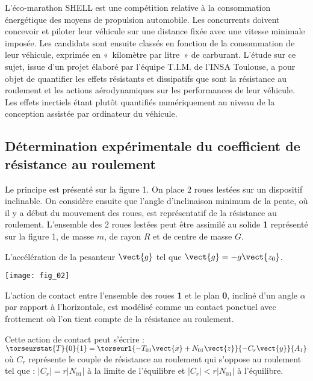 \ifprof
\else
\begin{multicols}{2}
\fi

\ifprof
\else
L’éco-marathon SHELL est une compétition relative à la consommation énergétique des moyens de propulsion automobile. Les concurrents doivent concevoir et piloter leur véhicule sur une distance fixée avec une vitesse minimale imposée.  Les candidats sont ensuite classés en fonction de la consommation de leur véhicule, exprimée en «~kilomètre par litre~» de carburant. L’étude sur ce sujet, issue d’un projet élaboré par l’équipe T.I.M. de l’INSA Toulouse, a pour objet de quantifier les effets résistants et dissipatifs que sont la résistance au roulement et les actions aérodynamiques sur les performances de leur véhicule. Les effets inertiels étant plutôt quantifiés numériquement au niveau de la conception assistée par ordinateur du véhicule. 
\fi

\subsection*{Détermination expérimentale du coefficient de résistance au roulement}

\ifprof
\else
Le principe est présenté sur la figure 1. On place 2 roues lestées sur un dispositif inclinable. On considère ensuite que l’angle d’inclinaison minimum de la pente, où il y a début du mouvement des roues, est représentatif de la résistance au roulement.  
L’ensemble des 2 roues lestées peut être assimilé au solide \textbf{1} représenté sur la figure 1, de masse $m$, de rayon $R$ et de centre de masse $G$. 

L'accélération de la pesanteur $\vect{g}$ tel que $\vect{g}=-g\vect{z_0}$. 


\begin{center}
\texttt{[image: fig\_02]}
\end{center}

L’action de contact entre l’ensemble des roues \textbf{1} et le plan \textbf{0}, incliné d’un angle $\alpha$ par rapport à l’horizontale, est  modélisé comme un contact ponctuel avec frottement où  l’on tient compte de la résistance au roulement. 

Cette action de contact peut s’écrire :$\torseurstat{T}{0}{1}=\torseurl{-T_{01}\vect{x}+N_{01}\vect{z}}{-C_r\vect{y}}{A_1}$ où $C_r$ représente le couple de résistance au roulement qui s’oppose au roulement tel que : $|C_r|=r|N_{01}|$ à la limite de l’équilibre et $|C_r|<r|N_{01}|$ à l’équilibre.


\end{multicols}
